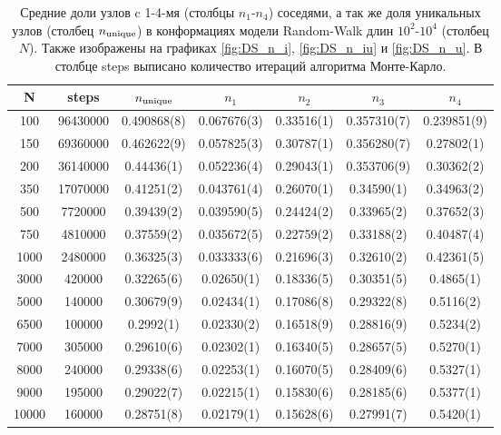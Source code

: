 \begin{table}[h]
    \centering

\begin{tabular}{|c|c|c|c|c|c|c|}
\hline
N & steps & $ n_{\textup{unique}} $ & $n_{1}$ & $n_{2}$ & $n_{3}$ & $n_{4}$ \\ \hline
100 & 96430000 & 0.490868(8) & 0.067676(3) & 0.33516(1) & 0.357310(7) & 0.239851(9) \\ \hline
150 & 69360000 & 0.462622(9) & 0.057825(3) & 0.30787(1) & 0.356280(7) & 0.27802(1) \\ \hline
200 & 36140000 & 0.44436(1) & 0.052236(4) & 0.29043(1) & 0.353706(9) & 0.30362(2) \\ \hline
350 & 17070000 & 0.41251(2) & 0.043761(4) & 0.26070(1) & 0.34590(1) & 0.34963(2) \\ \hline
500 & 7720000 & 0.39439(2) & 0.039590(5) & 0.24424(2) & 0.33965(2) & 0.37652(3) \\ \hline
750 & 4810000 & 0.37559(2) & 0.035672(5) & 0.22759(2) & 0.33188(2) & 0.40487(4) \\ \hline 
1000 & 2480000 & 0.36325(3) & 0.033333(6) & 0.21696(3) & 0.32610(2) & 0.42361(5) \\ \hline
3000 & 420000 & 0.32265(6) & 0.02650(1) & 0.18336(5) & 0.30351(5) & 0.4865(1) \\ \hline
5000 & 140000 & 0.30679(9) & 0.02434(1) & 0.17086(8) & 0.29322(8) & 0.5116(2) \\ \hline
6500 & 100000 & 0.2992(1) & 0.02330(2) & 0.16518(9) & 0.28816(9) & 0.5234(2) \\ \hline
7000 & 305000 & 0.29610(6) & 0.02302(1) & 0.16340(5) & 0.28657(5) & 0.5270(1) \\ \hline
8000 & 240000 & 0.29338(6) & 0.02253(1) & 0.16070(5) & 0.28409(6) & 0.5327(1) \\ \hline
9000 & 195000 & 0.29022(7) & 0.02215(1) & 0.15830(6) & 0.28185(6) & 0.5377(1) \\ \hline
10000 & 160000 & 0.28751(8) & 0.02179(1) & 0.15628(6) & 0.27991(7) & 0.5420(1) \\ \hline
\end{tabular}

    \caption{Средние доли узлов c 1-4-мя (столбцы $n_1$-$n_4$) соседями, а так же доля уникальных узлов (столбец $n_{\textup{unique}}$) в конформациях модели Random-Walk длин $10^{2}$-$10^{4}$ (столбец $N$). Также изображены на графиках \ref{fig:DS_n_i}, \ref{fig:DS_n_iu} и \ref{fig:DS_n_u}. В столбце steps выписано количество итераций алгоритма Монте-Карло.}
    \label{tab:Ran_Walk_neigh}
\end{table}

